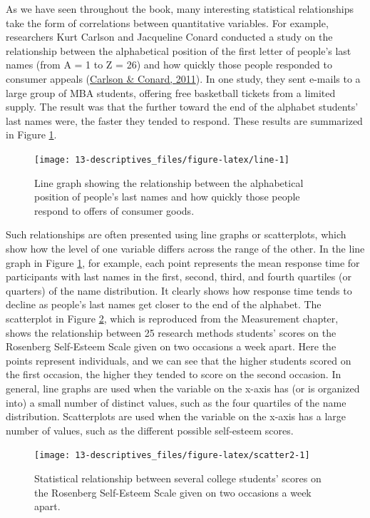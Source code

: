 \documentclass[
]{krantz}
\begin{document}
As we have seen throughout the book, many interesting statistical relationships take the form of correlations between quantitative variables. For example, researchers Kurt Carlson and Jacqueline Conard conducted a study on the relationship between the alphabetical position of the first letter of people's last names (from A = 1 to Z = 26) and how quickly those people responded to consumer appeals (\protect\hyperlink{ref-carlson2011last}{Carlson \& Conard, 2011}). In one study, they sent e-mails to a large group of MBA students, offering free basketball tickets from a limited supply. The result was that the further toward the end of the alphabet students' last names were, the faster they tended to respond. These results are summarized in Figure \ref{fig:line}.

\begin{figure}

{\centering \texttt{[image: 13-descriptives\_files/figure-latex/line-1]} 

}

\caption{Line graph showing the relationship between the alphabetical position of people’s last names and how quickly those people respond to offers of consumer goods.}\label{fig:line}
\end{figure}

Such relationships are often presented using line graphs or scatterplots, which show how the level of one variable differs across the range of the other. In the line graph in Figure \ref{fig:line}, for example, each point represents the mean response time for participants with last names in the first, second, third, and fourth quartiles (or quarters) of the name distribution. It clearly shows how response time tends to decline as people's last names get closer to the end of the alphabet. The scatterplot in Figure \ref{fig:scatter2}, which is reproduced from the Measurement chapter, shows the relationship between 25 research methods students' scores on the Rosenberg Self-Esteem Scale given on two occasions a week apart. Here the points represent individuals, and we can see that the higher students scored on the first occasion, the higher they tended to score on the second occasion. In general, line graphs are used when the variable on the x-axis has (or is organized into) a small number of distinct values, such as the four quartiles of the name distribution. Scatterplots are used when the variable on the x-axis has a large number of values, such as the different possible self-esteem scores.

\begin{figure}

{\centering \texttt{[image: 13-descriptives\_files/figure-latex/scatter2-1]} 

}

\caption{Statistical relationship between several college students’ scores on the Rosenberg Self-Esteem Scale given on two occasions a week apart.}\label{fig:scatter2}
\end{figure}
\end{document}
